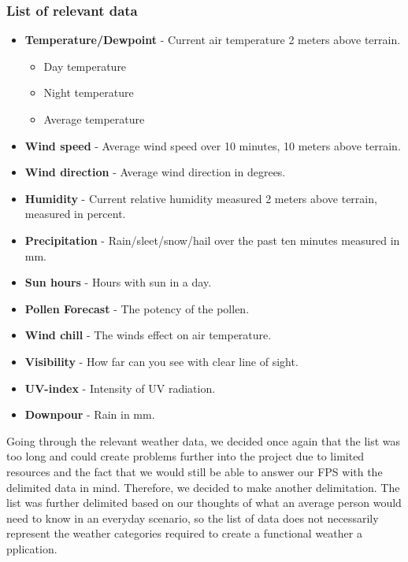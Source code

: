 

\subsubsection*{List of relevant data} %
\label{ssub:list_of_relevant_data}

\begin{itemize}
     \item \textbf{Temperature/Dewpoint} - Current air temperature 2 meters above terrain.
     \begin{itemize}
         \item Day temperature
         \item Night temperature
         \item Average temperature
     \end{itemize}
     \item \textbf{Wind speed} - Average wind speed over 10 minutes, 10 meters above terrain.
     \item \textbf{Wind direction} - Average wind direction in degrees.
     \item \textbf{Humidity} - Current relative humidity measured 2 meters above terrain, measured in percent.
     \item \textbf{Precipitation} - Rain/sleet/snow/hail over the past ten minutes measured in mm.
     \item \textbf{Sun hours} - Hours with sun in a day.
     \item \textbf{Pollen Forecast} - The potency of the pollen.
     \item \textbf{Wind chill} - The winds effect on air temperature.
     \item \textbf{Visibility} - How far can you see with clear line of sight.
     \item \textbf{UV-index} - Intensity of UV radiation.
     \item \textbf{Downpour} - Rain in mm.
 \end{itemize}

Going through the relevant weather data, we decided once again that the list was too long and could create problems further into the project due to limited resources and the fact that we would still be able to answer our FPS with the delimited data in mind. 
Therefore, we decided to make another delimitation. 
The list was further delimited based on our thoughts of what an average person would need to know in an everyday scenario, so the list of data does not necessarily represent the weather categories required to create a functional weather a	pplication. 

